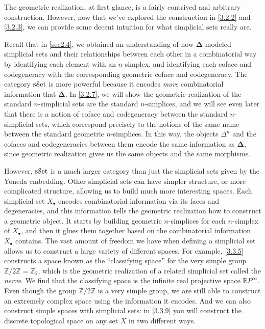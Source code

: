 \begin{intuition}\label{3.2.4}
	The geometric realization, at first glance, is a fairly contrived and arbitrary construction. However, now that we've explored the construction in \cref{3.2.2} and \cref{3.2.3}, we can provide some decent intuition for what simplicial sets really are.

	Recall that in \cref{sec2.4}, we obtained an understanding of how $\boldsymbol{\Delta} $ modeled simplicial sets and their relationships between each other in a combinatorial way by identifying each element with an $n$-simplex, and identifying each coface and codegeneracy with the corresponding geometric coface and codegeneracy. The category $\mathrm{s}\mathcal{S}\mathrm{et} $ is more powerful because it encodes \emph{more} combinatorial information that $\boldsymbol{\Delta} $. In \cref{3.2.7}, we will show the geometric realization of the standard $n$-simplicial sets are the standard $n$-simplices, and we will see even later that there is a notion of coface and codegeneracy between the standard $n$-simplicial sets, which correspond precisely to the notions of the same name between the standard geometric $n$-simplices. In this way, the objects $\Delta^n$ and the cofaces and codegeneracies between them encode the same information as $\boldsymbol{\Delta} $, since geometric realization gives us the same objects and the same morphisms.

	However, $\mathrm{s}\mathcal{S}\mathrm{et} $ is a much larger category than just the simplicial sets given by the Yoneda embedding. Other simplicial sets can have simpler structure, or more complicated structure, allowing us to build much more interesting spaces. Each simplicial set $X_{\bullet} $ encodes combinatorial information via its faces and degeneracies, and this information tells the geometric realization how to construct a geometric object. It starts by building geometric $n$-simplices for each $n$-simplex of $X_{\bullet} $, and then it glues them together based on the combinatorial information $X_{\bullet} $ contains. The vast amount of freedom we have when defining a simplicial set allows us to construct a large variety of different spaces. For example, \cref{3.3.5} constructs a space known as the ``classifying space'' for the very simple group $\mathbb{Z} /2\mathbb{Z} =\mathbb{Z} _2$, which is the geometric realization of a related simplicial set called the \emph{nerve}. We find that the classifying space is the infinite real projective space $\mathbb{R} P^\infty $. Even though the group $\mathbb{Z} /2\mathbb{Z} $ is a very simple group, we are still able to construct an extremely complex space using the information it encodes. And we can also construct simple spaces with simplicial sets: in \cref{3.3.9} you will construct the discrete topological space on any set $X$ in two different ways.


\end{intuition}
